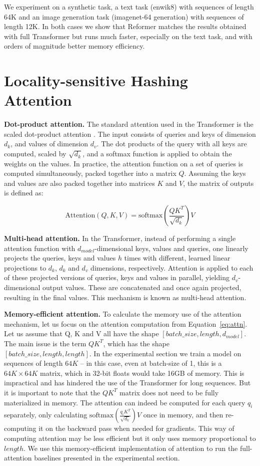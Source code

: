 We experiment on a synthetic task, a text task (enwik8) with sequences of length 64K and an image generation task (imagenet-64 generation) with sequences of length 12K. In both cases we show that Reformer matches the results obtained with full Transformer but runs much faster, especially on the text task, and with orders of magnitude better memory efficiency.

\section{Locality-sensitive Hashing Attention}

\textbf{Dot-product attention.} The standard attention used in the Transformer is the scaled dot-product attention \citep{transformer}. The input consists of queries and keys of dimension $d_k$, and values of dimension $d_v$. The dot products of the query with all keys are computed, scaled by $\sqrt{d_k}$, and a softmax function is applied to obtain the weights on the values. In practice, the attention function on a set of queries is computed simultaneously, packed together into a matrix $Q$.  Assuming the keys and values are also packed together into matrices $K$ and $V$, the matrix of outputs is defined as:

\begin{equation}\label{eq:attn}
   \mathrm{Attention}(Q, K, V) = \mathrm{softmax}(\frac{QK^T}{\sqrt{d_k}})V
\end{equation}

\textbf{Multi-head attention.} In the Transformer, instead of performing a single attention function with $d_{model}$-dimensional keys, values and queries, one linearly projects the queries, keys and values $h$ times with different, learned linear projections to $d_k$, $d_k$ and $d_v$ dimensions, respectively.  Attention is applied to each of these projected versions of queries, keys and values in parallel, yielding $d_v$-dimensional output values. These are concatenated and once again projected, resulting in the final values. This mechanism is known as multi-head attention.

\textbf{Memory-efficient attention.} To calculate the memory use of the attention mechanism, let us focus on the attention computation from Equation~\ref{eq:attn}.
Let us assume that Q, K and V all have the shape
$[batch\_size, length, d_{model}]$. The main issue is the term $QK^T$, which has the shape $[batch\_size, length, length]$. In the experimental section we train a model on sequences of length $64K$ -- in this case, even at batch-size of 1, this is a $64K \times 64K$ matrix, which in 32-bit floats would take 16GB of memory. This is impractical and has hindered the use of the Transformer for long sequences. But it is important to note that the $QK^T$ matrix does not need to be fully materialized in memory. The attention can indeed be computed for each query $q_i$ separately, only calculating $\mathrm{softmax}(\frac{q_iK^T}{\sqrt{d_k}})V$ 
once in memory, and then re-computing it on the backward pass when needed for gradients. This way of computing attention may be less efficient but it only uses memory proportional to $length$. We use this memory-efficient implementation of attention to run the full-attention baselines presented in the experimental section.

